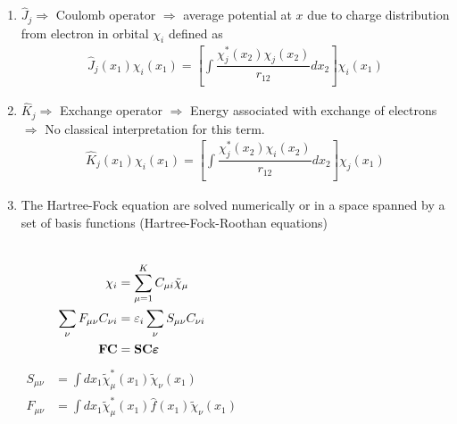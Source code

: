 \documentclass[slidestop,mathserif,compress,xcolor=svgnames]{beamer}
\begin{document}
\begin{frame}
\footnotesize{
\begin{enumerate}
\item $\hat{J}_j\Rightarrow$ Coulomb operator $\Rightarrow$ average potential at $x$ due to charge distribution from electron in orbital $\chi_i$ defined as
\begin{align*}
\hat{J}_j(x_1)\chi_i(x_1) = \left[\int\dfrac{\chi^\ast_j(x_2)\chi_j(x_2)}{r_{12}}dx_2\right]\chi_i(x_1)
\end{align*}
\item $\hat{K}_j\Rightarrow$ Exchange operator $\Rightarrow$ Energy associated with exchange of electrons $\Rightarrow$ No classical interpretation for this term.
\begin{align*}
\hat{K}_j(x_1)\chi_i(x_1) = \left[\int\dfrac{\chi^\ast_j(x_2)\chi_i(x_2)}{r_{12}}dx_2\right]\chi_j(x_1)
\end{align*}
\item The Hartree-Fock equation are solved numerically or in a space spanned by a set of basis functions (Hartree-Fock-Roothan equations)
\begin{columns}
\column{4cm}
\vspace{-0.5cm}
\begin{align*}
\chi_i &= \sum^K_{\mu=1}C_{\mu i}\tilde{\chi}_\mu\\
\sum_\nu F_{\mu\nu}C_{\nu i} &= \varepsilon_i\sum_\nu S_{\mu\nu}C_{\nu i}\\
{\bf FC}&={\bf SC}{\boldsymbol\varepsilon}
\end{align*}
\column{4cm}
\vspace{-0.35cm}
\begin{align*}
S_{\mu\nu} &= \int dx_1\tilde{\chi}^\ast_\mu(x_1)\tilde{\chi}_\nu(x_1)\\
F_{\mu\nu} &= \int dx_1\tilde{\chi}^\ast_\mu(x_1)\hat{f}(x_1)\tilde{\chi}_\nu(x_1)
\end{align*}
\end{columns}
\end{enumerate}
}
\end{frame}
\end{document}
